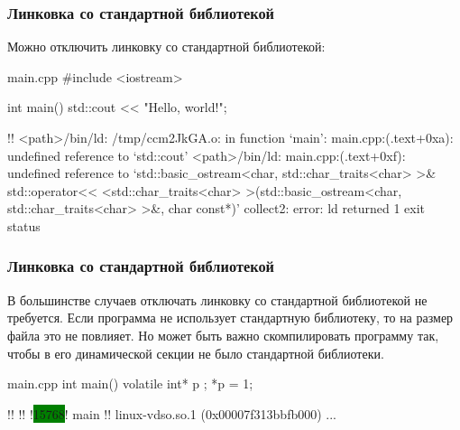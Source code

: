 \documentclass[compress, 8pt]{beamer}
\begin{document}
  \begin{frame}[fragile]

    \frametitle{Линковка со стандартной библиотекой}

    Можно отключить линковку со стандартной библиотекой:

    \begin{mytitledinplacelisting}[minted language=cpp]{main.cpp}
#include <iostream>

int main() {
    std::cout << "Hello, world!\n";
}
    \end{mytitledinplacelisting}

    \begin{terminalwindow}
!!
<path>/bin/ld: /tmp/ccm2JkGA.o: in function `main':
main.cpp:(.text+0xa): undefined reference to `std::cout'
<path>/bin/ld: main.cpp:(.text+0xf): undefined reference to `std::basic_ostream<char, std::char_traits<char> >& std::operator<< <std::char_traits<char> >(std::basic_ostream<char, std::char_traits<char> >&, char const*)'
collect2: error: ld returned 1 exit status
    \end{terminalwindow}

  \end{frame}

  \begin{frame}[fragile]

    \frametitle{Линковка со стандартной библиотекой}

    В большинстве случаев отключать линковку со стандартной библиотекой не требуется.
    Если программа не использует стандартную библиотеку,
    то на размер файла это не повлияет.
    Но может быть важно скомпилировать программу так, чтобы в его динамической
    секции не было стандартной библиотеки.

    \begin{mytitledinplacelisting}[minted language=cpp]{main.cpp}
int main() {
    volatile int* p {};
    *p = 1;
}
    \end{mytitledinplacelisting}

    \begin{terminalwindow}
!!
!!
!\colorbox{green}{15768}!   main
!!
linux-vdso.so.1 (0x00007f313bbfb000)
...
    \end{terminalwindow}

  \end{frame}
\end{document}
